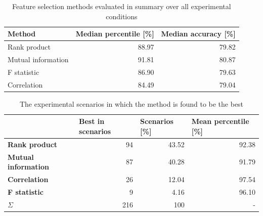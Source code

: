 \begin{table}[h]
\centering
\begin{adjustbox}{width=\textwidth}
\begin{tabular}{|l|r|r|}
\hline
\textbf{Method}    & \multicolumn{1}{l|}{\textbf{Median percentile {[}\%{]}}} & \multicolumn{1}{l|}{\textbf{Median accuracy {[}\%{]}}} \\ \hline
Rank product       & 88.97                                                    & 79.82                                                 \\ \hline
Mutual information & 91.81                                                    & 80.87                                                 \\ \hline
F statistic        & 86.90                                                    & 79.63                                                 \\ \hline
Correlation        & 84.49                                                    & 79.04                                                  \\ \hline
\end{tabular}
\end{adjustbox}
\caption{Feature selection methods evaluated in summary over all experimental conditions}
\label{tab:evaluation:compare-fsel-accuracy}
\end{table}

\begin{table}[h]
\centering
\begin{adjustbox}{width=\textwidth}
\begin{tabular}{|l|r|r|r|}
\hline
                            & \multicolumn{1}{l|}{\textbf{Best in scenarios}} & \multicolumn{1}{l|}{\textbf{Scenarios {[}\%{]}}} & \multicolumn{1}{l|}{\textbf{Mean percentile {[}\%{]}}} \\ \hline
\textbf{Rank product}       & 94                                                     & 43.52                                            & 92.38 \\ \hline
\textbf{Mutual information} & 87                                                      & 40.28                                            & 91.79 \\ \hline
\textbf{Correlation}        & 26                                                      & 12.04                                             & 97.54 \\ \hline
\textbf{F statistic}        & 9                                                       & 4.16                                             & 96.10 \\ \hline
\textbf{$\Sigma$}           & 216                                                     & 100                                       & -                                                      \\ \hline
\end{tabular}
\end{adjustbox}
\caption{The experimental scenarios in which the method is found to be the best}
\label{tab:evaluation:best-selection-method}
\end{table}

